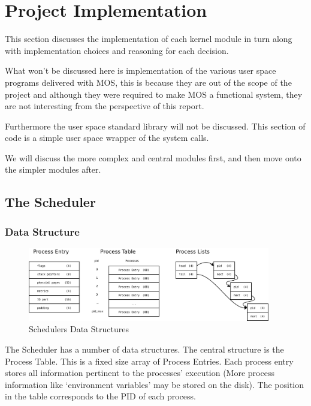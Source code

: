 \documentclass[a4paper]{report}
\begin{document}
\chapter{Project Implementation}

This section discusses the implementation of each kernel module in turn along with implementation choices and reasoning for each decision.

What won't be discussed here is implementation of the various user space programs delivered with MOS, this is because they are out of the scope of the project and although they were required to make MOS a functional system, they are not interesting from the perspective of this report.

Furthermore the user space standard library will not be discussed. This section of code is a simple user space wrapper of the system calls.

We will discuss the more complex and central modules first, and then move onto the simpler modules after.
















\clearpage

\section{The Scheduler}


\subsection{Data Structure}

\begin{figure}[ht]
\centering
\includegraphics[width=400px]{images/Scheduler_Structure}
\caption{Schedulers Data Structures}
\label{fig:WinTitleBarScreen}
\end{figure}


The Scheduler has a number of data structures. The central structure is the Process Table. This is a fixed size array of Process Entries. Each process entry stores all information pertinent to the processes' execution (More process information like `environment variables' may be stored on the disk). The position in the table corresponds to the PID of each process.
\end{document}
